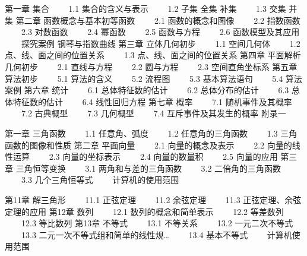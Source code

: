 第一章 集合
　　1.1 集合的含义与表示
　　1.2 子集 全集 补集
　　1.3 交集 并集
第二章 函数概念与基本初等函数
　　2.1 函数的概念和图像
　　2.2 指数函数
　　2.3 对数函数
　　2.4 幂函数
　　2.5 函数与方程
　　2.6 函数模型及其应用
　　探究案例 钢琴与指数曲线
第三章 立体几何初步
　　1.1 空间几何体
　　1.2 点、线、面之间的位置关系
　　1.3 点、线、面之间的位置关系
第四章 平面解析几何初步
　　2.1 直线与方程
　　2.2 圆与方程
　　2.3 空间直角坐标系
第五章 算法初步
　　5.1 算法的含义
　　5.2 流程图
　　5.3 基本算法语句
　　5.4 算法案例
第六章 统计
　　6.1 总体特征数的估计
　　6.2 总体分布的估计
　　6.3 总体特征数的估计
　　6.4 线性回归方程
第七章 概率
　　7.1 随机事件及其概率
　　7.2 古典概型
　　7.3 几何概型
　　7.4 互斥事件及其发生的概率
附录一

第一章 三角函数
　　1.1 任意角、弧度
　　1.2 任意角的三角函数
　　1.3 三角函数的图像和性质
第二章 平面向量
　　2.1 向量的概念及表示
　　2.2 向量的线性运算
　　2.3 向量的坐标表示
　　2.4 向量的数量积
　　2.5 向量的应用
第三章 三角恒等变换
　　3.1 两角和与差的三角函数
　　3.2 二倍角的三角函数
　　3.3 几个三角恒等式
　　计算机的使用范围

第11章 解三角形
　　11.1 正弦定理
　　11.2 余弦定理
　　11.3 正弦定理、余弦定理的应用
第12章 数列
　　12.1 数列的概念和简单表示
　　12.2 等差数列
　　12.3 等比数列
第13章 不等式
　　13.1 不等关系
　　13.2 一元二次不等式
　　13.3 二元一次不等式组和简单的线性规…
　　13.4 基本不等式
　　计算机使用范围


